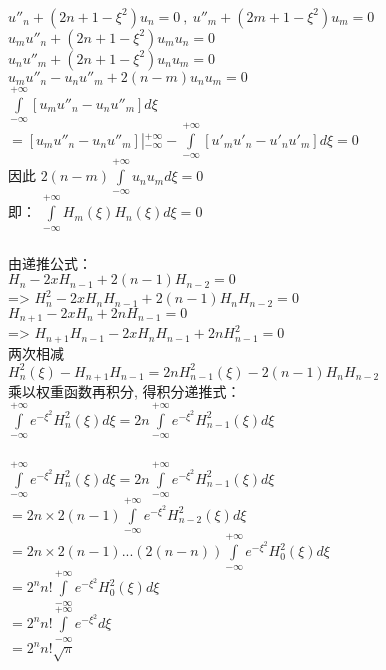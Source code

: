 \begin{frame}
	\frametitle{  }
	$u''_n+ (2n+1-\xi^2) u_n =0    ~, ~u''_m+ (2m+1-\xi^2) u_m =0  $\\  \vspace{0.3cm}
	$u_mu''_n +(2n+1-\xi^2) u_mu_n =0 $\\ 
	$u_nu''_m+ (2n+1-\xi^2) u_nu_m =0  $  \\  \vspace{0.3cm}
	$u_mu''_n -u_nu''_m +2(n-m)u_nu_m=0 $\\  \vspace{0.3cm}
	$ \int\limits_{-\infty}^{+\infty} [u_mu''_n -u_nu''_m] d\xi  $\\
	\hspace{2cm} 	$= [u_mu''_n -u_nu''_m] \left |_{-\infty} ^{+\infty}  \right. -\int\limits_{-\infty}^{+\infty} [u'_mu'_n -u'_nu'_m] d\xi =0$\\   
	因此	$ 2(n-m) \int\limits_{-\infty}^{+\infty} u_nu_m d\xi =0$ \\   \vspace{0.3cm}
	即：{ $ \int\limits_{-\infty}^{+\infty}  H_m(\xi) H_n(\xi)d\xi =0 $ }	
\end{frame}

\begin{frame}
	\frametitle{  }
	由递推公式：\\
	{$H_{n} -2xH_{n-1} +2(n-1)H_{n-2} =0  $ } \\
	=> 	{ $H^2_{n}-2xH_n H_{n-1}+2(n-1) H_n H_{n-2} =0  $ }\\   \vspace{0.3cm}
	{$H_{n+1} -2xH_{n} +2nH_{n-1} =0  $ } \\
	=>   { $H_{n+1} H_{n-1}-2xH_{n} H_{n-1}+2nH^2_{n-1} =0  $ } \\  \vspace{0.3cm}
	两次相减\\
     $H^2 _n(\xi) -H_{n+1} H_{n-1}=2n H^2 _{n-1}(\xi) - 2(n-1) H_n H_{n-2}$ \\	  \vspace{0.3cm}
	乘以权重函数再积分,  得积分递推式：\\
	{$\int\limits_{-\infty}^{+\infty} e^{-\xi^2} H^2 _n(\xi) d\xi =2n \int\limits_{-\infty}^{+\infty} e^{-\xi^{2}} H^2 _{n-1}(\xi) d\xi$ }\\	
\end{frame}	

\begin{frame}
	\frametitle{  }
	{$\int\limits_{-\infty}^{+\infty} e^{-\xi^2} H^2 _n(\xi) d\xi =2n \int\limits_{-\infty}^{+\infty} e^{-\xi^{2}} H^2 _{n-1}(\xi) d\xi$ }\\
	$= 2n \times 2(n-1) \int\limits_{-\infty}^{+\infty} e^{-\xi^{2}} H^2 _{n-2}(\xi) d\xi$  \\
	$= 2n \times 2(n-1) ... (2(n-n)) \int\limits_{-\infty}^{+\infty} e^{-\xi^{2}} H^2 _{0}(\xi) d\xi$  \\
	$= 2^n n! \int\limits_{-\infty}^{+\infty} e^{-\xi^{2}} H^2 _{0}(\xi) d\xi$  \\	
	$= 2^n n! \int\limits_{-\infty}^{+\infty} e^{-\xi^{2}} d\xi$  \\	
	$= 2^n n! \sqrt{\pi} $ \\	
\end{frame}	

